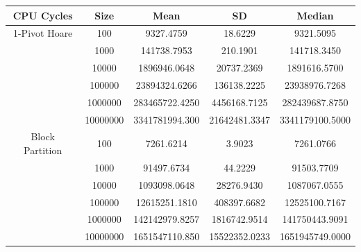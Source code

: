 \documentclass[a4paper,oneside,12pt]{book}
\begin{document}
\begin{center}
    \vspace{2em}
    \small
    \begin{tabular}{ |c c | c c c| }
        \hline
        CPU Cycles      & Size     & Mean           & SD            & Median \\
        \hline
        1-Pivot Hoare   & 100      & 9327.4759      & 18.6229       & 9321.5095 \\
                        & 1000     & 141738.7953    & 210.1901      & 141718.3450 \\
                        & 10000    & 1896946.0648   & 20737.2369    & 1891616.5700 \\
                        & 100000   & 23894324.6266  & 136138.2225   & 23938976.7268 \\
                        & 1000000  & 283465722.4250 & 4456168.7125  & 282439687.8750 \\
                        & 10000000 & 3341781994.300 & 21642481.3347 & 3341179100.5000 \\
        Block Partition & 100      & 7261.6214      & 3.9023        & 7261.0766 \\
                        & 1000     & 91497.6734     & 44.2229       & 91503.7709 \\
                        & 10000    & 1093098.0648   & 28276.9430    & 1087067.0555 \\
                        & 100000   & 12615251.1810  & 408397.6682   & 12525100.7167 \\
                        & 1000000  & 142142979.8257 & 1816742.9514  & 141750443.9091 \\
                        & 10000000 & 1651547110.850 & 15522352.0233 & 1651945749.0000 \\
        \hline
    \end{tabular}


\end{center}
\end{document}
